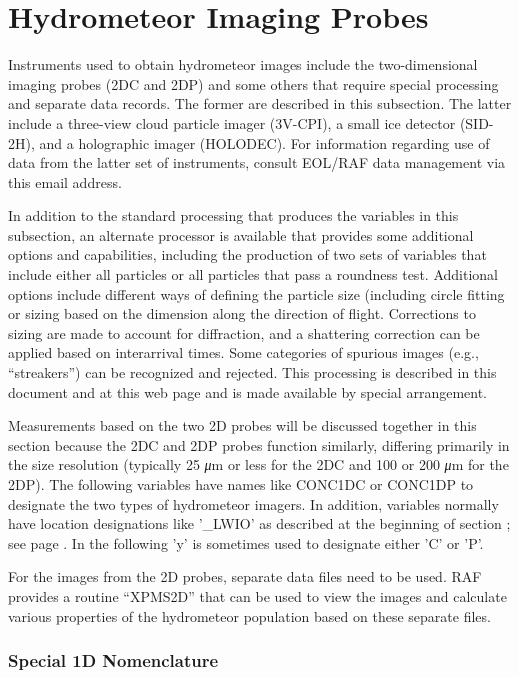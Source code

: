 \documentclass[
]{book}
\begin{document}
\hypertarget{hydrometeor-imaging-probes}{%
\section{Hydrometeor Imaging Probes}\label{hydrometeor-imaging-probes}}

Instruments used to obtain hydrometeor images include the two-dimensional imaging probes (2DC and 2DP) and some others that require special processing and separate data records. The former are described in this subsection. The latter include a three-view cloud particle imager (3V-CPI), a small ice detector (SID-2H), and a holographic imager (HOLODEC). For information regarding use of data from the latter set of instruments, consult EOL/RAF data management via this email address.

In addition to the standard processing that produces the variables in this subsection, an alternate processor is available that provides some additional options and capabilities, including the production of two sets of variables that include either all particles or all particles that pass a roundness test. Additional options include different ways of defining the particle size (including circle fitting or sizing based on the dimension along the direction of flight. Corrections to sizing are made to account for diffraction, and a shattering correction can be applied based on interarrival times. Some categories of spurious images (e.g., ``streakers'') can be recognized and rejected. This processing is described in this document and at this web page and is made available by special arrangement.

Measurements based on the two 2D probes will be discussed together in this section because the 2DC and 2DP probes function similarly, differing primarily in the size resolution (typically 25 {\emph{μ}}m or less for the 2DC and 100 or 200 {\emph{μ}}m for the 2DP). The following variables have names like CONC1DC or CONC1DP to designate the two types of hydrometeor imagers. In addition, variables normally have location designations like '\_LWIO' as described at the beginning of section ; see page . In the following 'y' is sometimes used to designate either 'C' or 'P'.

For the images from the 2D probes, separate data files need to be used. RAF provides a routine ``XPMS2D'' that can be used to view the images and calculate various properties of the hydrometeor population based on these separate files.

\hypertarget{special-1d-nomenclature}{%
\subsubsection*{Special 1D Nomenclature}\label{special-1d-nomenclature}}
\end{document}
